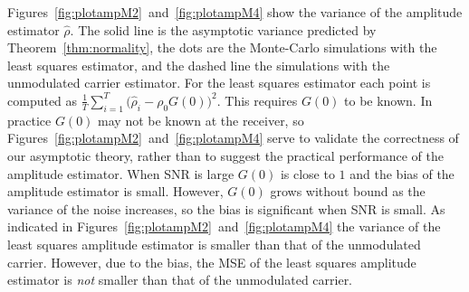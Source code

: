 \documentclass{article}
\begin{document}
Figures~\ref{fig:plotampM2}~and~\ref{fig:plotampM4} show the variance of the amplitude estimator $\hat{\rho}$.   The solid line is the asymptotic variance predicted by Theorem~\ref{thm:normality}, the dots are the Monte-Carlo simulations with the least squares estimator, and the dashed line the simulations with the unmodulated carrier estimator.  For the least squares estimator each point is computed as $\tfrac{1}{T}\sum_{i=1}^T\big(\hat{\rho}_i - \rho_0G(0)\big)^2$.  This requires $G(0)$ to be known.  In practice $G(0)$ may not be known at the receiver, so Figures~\ref{fig:plotampM2}~and~\ref{fig:plotampM4} serve to validate the correctness of our asymptotic theory, rather than to suggest the practical performance of the amplitude estimator.  When SNR is large $G(0)$ is close to $1$ and the bias of the amplitude estimator is small.  However, $G(0)$ grows without bound as the variance of the noise increases, so the bias is significant when SNR is small.  As indicated in Figures~\ref{fig:plotampM2}~and~\ref{fig:plotampM4} the variance of the least squares amplitude estimator is smaller than that of the unmodulated carrier.  However, due to the bias, the MSE of the least squares amplitude estimator is \emph{not} smaller than that of the unmodulated carrier.




\end{document}
